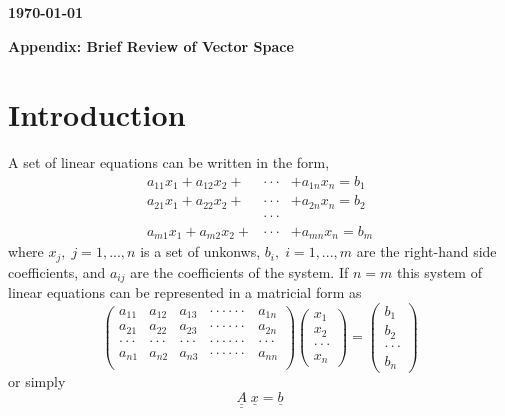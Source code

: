 \documentclass[12pts,a4paper,amsmath,amssymb,floatfix]{article}%
\begin{document}
\begin{flushright}
{\bf \today}
\end{flushright}


\begin{center}
{\bf {\Large Appendix: Brief Review of Vector Space}} 
\end{center}


\section{Introduction}

A set of linear equations can be written in the form,
\begin{eqnarray}
a_{11}x_{1} + a_{12}x_{2} + & \cdot\cdot\cdot & + a_{1n}x_{n} = b_{1} \nonumber \\
a_{21}x_{1} + a_{22}x_{2} + & \cdot\cdot\cdot & + a_{2n}x_{n} = b_{2} \nonumber \\
                          & \cdot\cdot\cdot &                     \nonumber \\
a_{m1}x_{1} + a_{m2}x_{2} + & \cdot\cdot\cdot & + a_{mn}x_{n} = b_{m}  \label{app:system1}
\end{eqnarray}
where $x_{j},\;j=1, ...,  n$ is a set of unkonws, $b_{i},\;i=1, ..., m$ are the right-hand side coefficients, and $a_{ij}$ are the coefficients of the system. If $n=m$ this system of linear equations can be represented in a matricial form as
\begin{equation}
\begin{pmatrix}
a_{11} & a_{12} & a_{13} & \cdot\cdot\cdot\cdot\cdot\cdot & a_{1n} \\
a_{21} & a_{22} & a_{23} & \cdot\cdot\cdot\cdot\cdot\cdot & a_{2n} \\
\cdot\cdot\cdot & \cdot\cdot\cdot  & \cdot\cdot\cdot & \cdot\cdot\cdot\cdot\cdot\cdot & \cdot\cdot\cdot \\
a_{n1} & a_{n2} & a_{n3} & \cdot\cdot\cdot\cdot\cdot\cdot & a_{nn} \\
\end{pmatrix}
\begin{pmatrix}
x_{1} \\ x_{2} \\ \cdot\cdot\cdot \\  x_{n}
\end{pmatrix}
=
\begin{pmatrix}
b_{1} \\ b_{2} \\ \cdot\cdot\cdot \\  b_{n}
\end{pmatrix}\label{app:sysmat1}
\end{equation} 
or simply
\begin{equation} 
  \underline{\underline{A}}\;\underline{x}=\underline{b}\label{app:sysmat1}
\end{equation}
\end{document}
